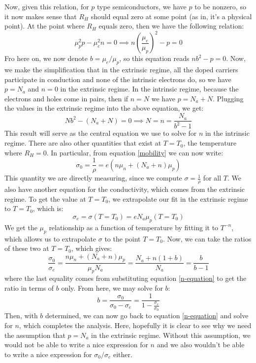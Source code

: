 \documentclass[10pt]{article}
\begin{document}
	Now, given this relation, for \( p \) type semiconductors, we have \( p \) to be nonzero, so it now makes
	sense that \( R_H \) should equal zero at some point (as in, it's a physical point). 
	At the point where \( R_H \) equals zero, then we
	have the following relation:
	\[
		\mu_p^2 p - \mu_e^2 n = 0 \implies n\left( \frac{\mu_e}{\mu_p} \right)^2 - p = 0
	\]
	Fro here on, we now denote \( b = \mu_e / \mu_p \), so this equation reads \( nb^2 - p = 0 \). Now, we
	make the simplification that in the extrinsic regime, all the doped carriers participate in conduction and
	none of the intrinsic electrons do, so we have \( p = N_a \) and \( n = 0 \) in the extrinsic regime.
	In the intrinsic regime, because the electrons and holes come in pairs, then if \( n = N \) we have \( p
	= N_a + N \). Plugging the values in the extrinsic regime into the above equation, we get:
	\begin{equation}
		\label{n-equation}
		Nb^2 - (N_a + N) = 0 \implies N = n = \frac{N_a}{b^2 - 1} 
	\end{equation}
	This result will serve as the central equation we use to solve for \( n \) in the intrinsic regime.
	There are also other quantities that exist at \( T = T_0 \), the temperature where \( R_H = 0 \). In
	particular, from equation \ref{mobility} we can now write:
	\[
		\sigma_0 = \frac{1}{\rho} = e(n \mu_n + (N_a + n)\mu_p)
	\]
	This quantity we are directly measuring, since we compute \( \sigma = \frac{1}{\rho} \) for all \( T \). 
	We also have another equation for the conductivity, which comes from the extrinsic regime. To get the
	value at \( T = T_0 \), we extrapolate our fit in the extrinsic regime to \( T = T_0 \), which is:
	\[
		\sigma_e = \sigma(T = T_0) = e N_a \mu_p(T = T_0)
	\]
	We get the \( \mu_p \) relationship as a function of temperature by fitting it to \( T^{-n} \), which
	allows us to extrapolate \( \sigma \) to the point \( T = T_0 \).
	Now, we can take the ratios of these two at \( T = T_0 \), which gives:
	\[
		\frac{\sigma_0}{\sigma_e} = \frac{n \mu_n + (N_a + n)\mu_p}{\mu_p N_a} = 
		\frac{N_a + n(1 + b)}{N_a} = \frac{b}{b - 1}
	\]
	where the last equality comes from substituting equation \ref{n-equation} to get the ratio in terms of \(
	b\) only. From here, we may solve for \( b \):
	\[
		b = \frac{\sigma_0}{\sigma_0 - \sigma_e} = \frac{1}{1- \frac{\sigma_e}{\sigma_0}}
	\]
	Then, with \( b \) determined, we can now go back to equation \ref{n-equation} and solve for \( n \),
	which completes the analysis. Here, hopefully it is clear to see why we need the assumption that \( p =
	N_a \) in the extrinsic regime. Without this assumption, we would not be able to write a nice expression
	for \( n \) and we also wouldn't be able to write a nice expression for \( \sigma_0 / \sigma_e \) either. 
\end{document}
